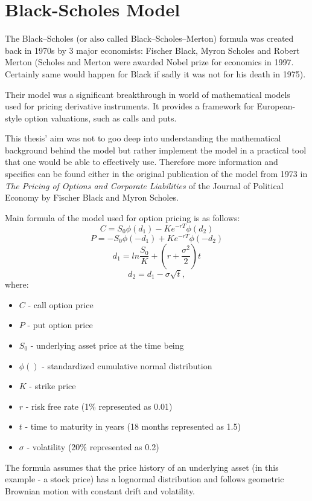 \section{Black-Scholes Model}
    The Black--Scholes (or also called Black--Scholes--Merton) formula was created back in 1970s by 3 major economists: Fischer Black, Myron Scholes and Robert Merton (Scholes and Merton were awarded Nobel prize for economics in 1997. Certainly same would happen for Black if sadly it was not for his death in 1975).
    
    Their model was a significant breakthrough in world of mathematical models used for pricing derivative instruments. It provides a framework for European-style option valuations, such as calls and puts.
    
    This thesis' aim was not to goo deep into understanding the mathematical background behind the model but rather implement the model in a practical tool that one would be able to effectively use. Therefore more information and specifics can be found either in the original publication \cite{10.2307/1831029} of the model from 1973 in \textit{The Pricing of Options and Corporate Liabilities} of the Journal of Political Economy by Fischer Black and Myron Scholes.
    
    Main formula of the model used for option pricing is as follows:
    \[
    C = S_0\phi(d_1) - Ke^{-rT}\phi(d_2)
    \]
    \[
    P = -S_0\phi(-d_1) + Ke^{-rT}\phi(-d_2)
    \]
    \[
    d_1 = ln\frac{S_0}{K} + (r+\frac{\sigma^2}{2})t
    \]
    \[
    d_2 = d_1 - \sigma\sqrt{t},
    \]
    where:
    \begin{itemize}
        \item $C$ - call option price
        \item $P$ - put option price
        \item $S_0$ - underlying asset price at the time being
        \item $\phi()$ - standardized cumulative normal distribution
        \item $K$ - strike price
        \item $r$ - risk free rate (1\% represented as 0.01)
        \item $t$ - time to maturity in years (18 months represented as 1.5)
        \item $\sigma$ - volatility (20\% represented as 0.2)
    
    \end{itemize}
    
    The formula assumes that the price history of an underlying asset (in this example - a stock price) has a lognormal distribution and follows geometric Brownian motion with constant drift and volatility. 
